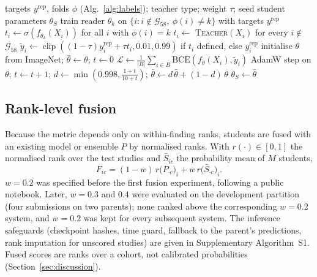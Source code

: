 \documentclass{ieeeaccess}
\newcommand{\gold}{$\mathcal{G}_{58}$}
\begin{document}
\begin{algorithm}[!t]
\caption{Teacher--student distillation}
\label{alg:distill}
\begin{algorithmic}[1]
\Require targets $y^{\mathrm{rep}}$, folds $\phi$ (Alg.~\ref{alg:labels}); teacher type; weight $\tau$; seed
\Ensure student parameters $\theta_S$
    \State train reader $\theta_k$ on $\{i: i\notin\text{\gold},\ \phi(i)\ne k\}$ with targets $y^{\mathrm{rep}}$
    \State $t_i\gets\sigma(f_{\theta_k}(X_i))$ for all $i$ with $\phi(i)=k$ 
  \EndFor
\Else
  \State $t_i\gets$ \textsc{Teacher}$(X_i)$ for every $i\notin$ \gold {}
\EndIf
\For{each $i\notin$ \gold}
  \State $\tilde{y}_i\gets\operatorname{clip}((1-\tau)y^{\mathrm{rep}}_i+\tau t_i,0.01,0.99)$ if $t_i$ defined, else $y^{\mathrm{rep}}_i$
\EndFor
\State initialise $\theta$ from ImageNet; $\bar\theta\gets\theta$; $t\gets0$
  \For{each batch $B\subset\{i\notin\text{\gold}\}$}
    \State $\mathcal{L}\gets\frac{1}{|B|}\sum_{i\in B}\mathrm{BCE}(f_\theta(X_i),\tilde{y}_i)$ 
    \State AdamW step on $\theta$; $t\gets t+1$; $d\gets\min(0.998,\frac{1+t}{10+t})$; $\bar\theta\gets d\,\bar\theta+(1-d)\,\theta$
  \EndFor
\EndFor
\State \Return $\theta_S\gets\bar\theta$
\end{algorithmic}
\end{algorithm}

\subsection{Rank-level fusion}
\label{sec:method-fusion}
Because the metric depends only on within-finding ranks, students are fused with an existing model or ensemble $P$ by
normalised ranks. With $r(\cdot)\in[0,1]$ the normalised rank over the test studies and $\bar{S}_{ic}$ the probability mean
of $M$ students,
\begin{equation}
F_{ic}=(1-w)\,r\big(P_{\cdot c}\big)_i+w\,r\big(\bar{S}_{\cdot c}\big)_i .
\label{eq:blend}
\end{equation}
$w=0.2$ was specified before the first fusion experiment, following a public notebook. Later, $w=0.3$ and $0.4$ were
evaluated on the development partition (four submissions on two parents); none ranked above the corresponding $w=0.2$
system, and $w=0.2$ was kept for every subsequent system. The inference safeguards (checkpoint hashes, time guard, fallback to the parent's
predictions, rank imputation for unscored studies) are given in Supplementary Algorithm~S1. Fused scores are ranks over a
cohort, not calibrated probabilities (Section~\ref{sec:discussion}).
\end{document}
